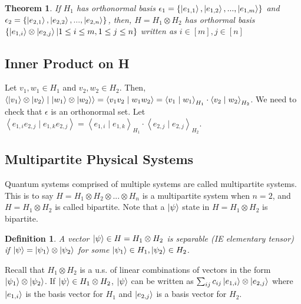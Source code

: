 \documentclass[12pt]{article}
\theoremstyle{plain}
\newtheorem{theorem}[lemma]{Theorem}
\theoremstyle{nonumberplain}
\theoremstyle{plain}
\newtheorem{definition}[lemma]{Definition}
\theoremstyle{nonumberplain}
\newcommand\1{{\bf 1}}
\newcommand{\<}{\left\langle}
\renewcommand{\>}{\right\rangle}
\newcommand{\inp}[2]{\left\langle#1\mid #2\right\rangle} %
\begin{document}
\begin{theorem}
If $H_1$ has orthonormal basis $\epsilon_1=\lbrace\ket{e_{1,1}},\ket{e_{1,2}},...,\ket{e_{1,m}}\rbrace$ and $\epsilon_2=\lbrace\ket{e_{2,1}},\ket{e_{2,2}},...,\ket{e_{2,n}}\rbrace$, then, $H=H_1\otimes H_2$ has orthormal basis $\lbrace\ket{e_{1,i}}\otimes\ket{e_{2,j}}\vert 1\leq i \leq m, 1 \leq j \leq n\rbrace$ written as $i\in \left[ m \right],j\in \left[ n \right] $
\end{theorem}


\subsection{Inner Product on H}
Let $v_1, w_1\in H_1$ and $v_2, w_2\in H_2$. Then, $\inp{\ket{v_1}\otimes\ket{v_2}}{\ket{w_1}\otimes\ket{w_2}}=\inp{v_1v_2}{w_1w_2}=\inp{v_1}{w_1}_{H_1}\cdot\inp{v_2}{w_2}_{H_2}$. We need to check that $\epsilon$ is an orthonormal set. Let $\inp{e_{1,i}e_{2,j}}{e_{1,k}e_{2,j}}=\inp{e_{1,i}}{e_{1,k}}_{H_1}\cdot\inp{e_{2,j}}{e_{2,j}}_{H_2}$.


\subsection{Multipartite Physical Systems}
Quantum systems comprised of multiple systems are called multipartite systems. This is to say $H=H_1\otimes H_2 \otimes ... \otimes H_n$ is a multipartite system when $n=2$, and $H=H_1\otimes H_2$ is called bipartite. Note that a $\ket{\psi}$ state in $H=H_1\otimes H_2$ is bipartite.
\begin{definition}
A vector $\ket{\psi}\in H=H_1\otimes H_2$ is separable (IE elementary tensor) if $\ket{\psi}=\ket{\psi_1}\otimes \ket{\psi_2}$ for some $\ket{\psi_1}\in H_1,\ket{\psi_2}\in H_2$.
\end{definition}
Recall that $H_1\otimes H_2$ is a u.s. of linear combinations of vectors in the form $\ket{\psi_1}\otimes \ket{\psi_2}$. If $\ket{\psi}\in H_1\otimes H_2$, $\ket{\psi}$ can be written as $\sum_{ij}c_{ij}\ket{e_{1,i}}\otimes\ket{e_{2,j}}$ where $\ket{e_{1,i}}$ is the basis vector for $H_1$ and $\ket{e_{2,j}}$ is a basis vector for $H_2$.
\end{document}
